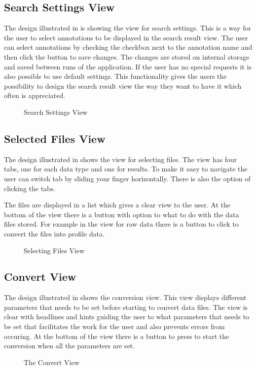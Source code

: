 \subsection{Search Settings View}
The design illustrated in  is showing the view for search settings. This is a way for the user to select annotations to be displayed in the search result view. The user can select annotations by checking the checkbox next to the annotation name and then click the button to save changes. The changes are stored on internal storage and saved between runs of the application. If the user has no special requests it is also possible to use default settings. This functionality gives the users the possibility to design the search result view the way they want to have it which often is appreciated. 

\begin{figure}[ht]
\caption{Search Settings View}
\label{fig:and_search_settings}
\end{figure}
\FloatBarrier

\subsection{Selected Files View}
The design illustrated in  shows the view for selecting files. The view has four tabs, one for each data type and one for results. To make it easy to navigate the user can switch tab by sliding your finger horizontally. There is also the option of clicking the tabs. 

The files are displayed in a list which gives a clear view to the user. At the bottom of the view there is a button with option to what to do with the data files stored. For example in the view for raw data there is a button to click to convert the files into profile data.

\begin{figure}[h]
\caption{Selecting Files View}
\label{fig:and_selected}
\end{figure}
\FloatBarrier

\subsection{Convert View}
The design illustrated in  shows the conversion view. This view displays different parameters that needs to be set before starting to convert data files. The view is clear with headlines and hints guiding the user to what parameters that needs to be set that facilitates the work for the user and also prevents errors from occuring. At the bottom of the view there is a button to press to start the conversion when all the parameters are set. 

\begin{figure}[h]
\caption{The Convert View}
\label{fig:and_convert_man} 
\end{figure}
\FloatBarrier